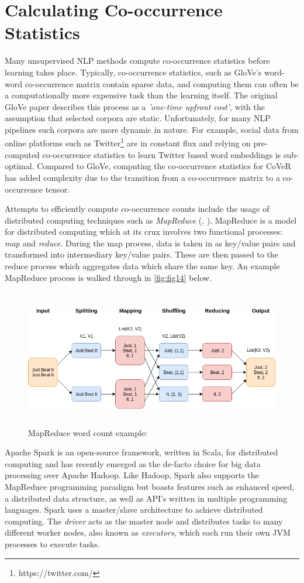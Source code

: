 \section{Calculating Co-occurrence Statistics}
Many unsupervised NLP methods compute co-occurrence statistics before learning takes place. Typically, co-occurrence statistics, such as GloVe's word-word co-occurrence matrix contain sparse data, and computing them can often be a computationally more expensive task than the learning itself. The original GloVe paper describes this process as a \textit{'one-time upfront cost'}, with the assumption that selected corpora are static. Unfortunately, for many NLP pipelines such corpora are more dynamic in nature. For example, social data from online platforms such as Twitter\footnote{https://twitter.com/} are in constant flux and relying on pre-computed co-occurrence statistics to learn Twitter based word embeddings is sub-optimal. Compared to GloVe, computing the co-occurrence statistics for CoVeR has added complexity due to the transition from a co-occurrence matrix to a co-occurrence tensor.

\noindent
\newline
Attempts to efficiently compute co-occurrence counts include the usage of distributed computing techniques such as \textit{MapReduce} (\cite{Lin2008}, \cite{Wittek2013}). MapReduce is a model for distributed computing which at its crux involves two functional processes: \textit{map} and \textit{reduce}. During the map process, data is taken in as key/value pairs and transformed into intermediary key/value pairs. These are then passed to the reduce process which aggregates data which share the same key. An example MapReduce process is walked through in \autoref{fig:fig14} below. 

\begin{figure}[h]
	\includegraphics[width=14cm, height=6cm]{./figures/fig14}
	\centering
	\caption[MapReduce Word Count Example]{MapReduce word count example:}
	\label{fig:fig14}
\end{figure}
\noindent
Apache Spark is an open-source framework, written in Scala, for distributed computing and has recently emerged as the de-facto choice for big data processing over Apache Hadoop. Like Hadoop, Spark also supports the MapReduce programming paradigm but boasts features such as enhanced speed, a distributed data structure, as well as API's written in multiple programming languages. Spark uses a master/slave architecture to achieve distributed computing. The \textit{driver} acts as the master node and distributes tasks to many different worker nodes, also known as \textit{executors}, which each run their own JVM processes to execute tasks.

